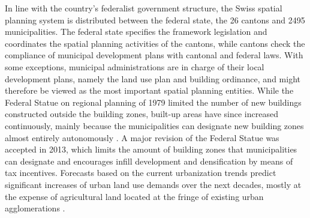 \documentclass[10pt,letterpaper]{article}
\begin{document}
In line with the country's federalist government structure, the Swiss spatial planning system is distributed between the federal state, the 26 cantons and 2495 municipalities. The federal state specifies the framework legislation and coordinates the spatial planning activities of the cantons, while cantons check the compliance of municipal development plans with cantonal and federal laws. With some exceptions, municipal administrations are in charge of their local development plans, namely the land use plan and building ordinance, and might therefore be viewed as the most important spatial planning entities.
While the Federal Statue on regional planning of 1979 limited the number of new buildings constructed outside the building zones, built-up areas have since increased continuously, mainly because the municipalities can designate new building zones almost entirely autonomously \cite{jaeger2014improving}. A major revision of the Federal Statue was accepted in 2013, %
which limits the amount of building zones that municipalities can designate and encourages infill development and densification by means of tax incentives.
Forecasts based on the current urbanization trends predict significant increases of urban land use demands over the next decades, mostly at the expense of agricultural land located at the fringe of existing urban agglomerations \cite{price2015future}.
\end{document}
